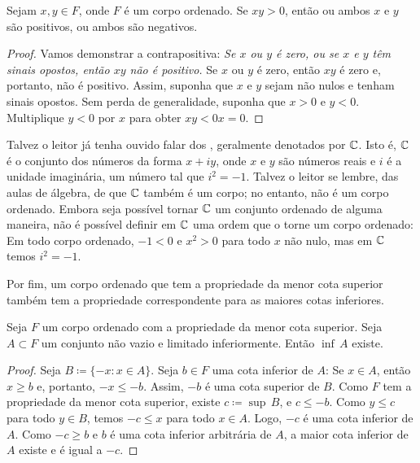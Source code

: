 \begin{prop}
Sejam $x,y \in F$, onde $F$ é um corpo ordenado. Se
$xy > 0$, então ou ambos $x$ e $y$ são positivos, ou ambos são negativos.
\end{prop}

\begin{proof}
Vamos demonstrar a contrapositiva: \emph{Se $x$ ou $y$ é zero, ou
se $x$ e $y$ têm sinais opostos, então $xy$ não é positivo.}
Se $x$ ou $y$ é zero, então $xy$ é zero e, portanto, não é positivo.
Assim, suponha que $x$ e $y$ sejam não nulos e tenham
sinais opostos.
Sem perda de generalidade,
suponha que $x > 0$ e $y < 0$.
Multiplique $y < 0$ por $x$ para obter $xy < 0x = 0$.
\end{proof}

\begin{example} \label{example:complexfield}
Talvez o leitor já tenha ouvido falar dos \emph{},
geralmente denotados por ${\mathbb{C}}$.
Isto é, ${\mathbb{C}}$ é o conjunto dos números da forma
$x + iy$, onde $x$ e $y$ são números reais e $i$ é a
unidade imaginária, um número tal que $i^2 = -1$. Talvez o leitor
se lembre, das aulas de álgebra, de que ${\mathbb{C}}$ também é um corpo; no entanto, não é um
corpo ordenado. Embora seja possível tornar ${\mathbb{C}}$ um conjunto ordenado de
alguma maneira, não é possível definir em ${\mathbb{C}}$ uma ordem que o torne um
corpo ordenado: Em todo corpo ordenado,
$-1 < 0$ e $x^2 > 0$ para todo $x$ não nulo, mas em ${\mathbb{C}}$ temos
$i^2 = -1$.
\end{example}

Por fim, um corpo ordenado que tem a propriedade da menor cota superior também
tem a propriedade correspondente para as maiores cotas inferiores.

\begin{prop}
Seja $F$ um corpo ordenado com a propriedade da menor cota superior.
Seja $A \subset F$ um conjunto não vazio e limitado inferiormente.
Então $\inf\, A$ existe.
\end{prop}

\begin{proof}
Seja $B \coloneqq \{ -x : x \in A \}$. Seja $b \in F$ uma cota inferior de $A$:
Se $x \in A$, então $x \geq b$
e, portanto, $-x \leq -b$. Assim, $-b$
é uma cota superior de $B$.
Como $F$ tem a propriedade da menor cota superior, existe $c\coloneqq\sup\, B$, e $c \leq -b$.
Como $y \leq c$
para todo $y \in B$, temos $-c \leq x$ para todo $x \in A$.
Logo,
$-c$ é uma cota inferior de $A$. Como $-c \geq b$
e $b$ é uma cota inferior arbitrária de $A$,
a maior cota inferior de $A$ existe e é igual a $-c$.
\end{proof}

